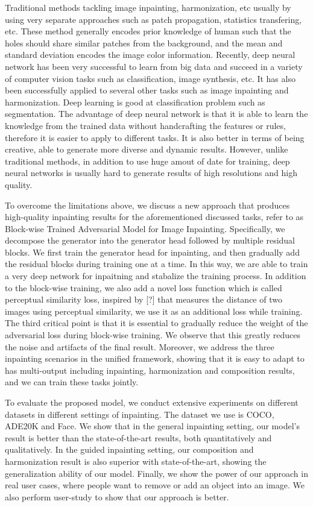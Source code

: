 \documentclass[runningheads]{llncs}
\begin{document}
Traditional methods tackling image inpainting, harmonization, etc usually by using very separate approaches such as patch propagation, statistics transfering, etc. These method generally encodes prior knowledge of human such that the holes should share similar patches from the background, and the mean and standard deviation encodes the image color information. Recently, deep neural network has been very successful to learn from big data and succeed in a variety of computer vision tasks such as classification, image synthesis, etc. It has also been successfully applied to several other tasks such as image inpainting and harmonization. Deep learning is good at classification problem such as segmentation. The advantage of deep neural network is that it is able to learn the knowledge from the trained data without handcrafting the features or rules, therefore it is easier to apply to different tasks. It is also better in terms of being creative, able to generate more diverse and dynamic results. However, unlike traditional methods, in addition to use huge amout of date for training, deep neural networks is usually hard to generate results of high resolutions and high quality.

To overcome the limitations above, we discuss a new approach that produces high-quality inpainting results for the aforementioned discussed tasks, refer to as Block-wise Trained Adversarial Model for Image Inpainting. Specifically, we decompose the generator into the generator head followed by multiple residual blocks. We first train the generator head for inpainting, and then gradually add the residual blocks during training one at a time. In this way, we are able to train a very deep network for inpaitning and stabalize the training process. In addition to the block-wise training, we also add a novel loss function which is called perceptual similarity loss, inspired by [?] that measures the distance of two images using perceptual similarity, we use it as an additional loss while training. The third critical point is that it is essential to gradually reduce the weight of the adversarial loss during block-wise training. We observe that this greatly reduces the noise and artifacts of the final result. Moreover, we address the three inpainting scenarios in the unified framework, showing that it is easy to adapt to has multi-output including inpainting, harmonization and composition results, and we can train these tasks jointly. 

To evaluate the proposed model, we conduct extensive experiments on different datasets in different settings of inpainting. The dataset we use is COCO, ADE20K and Face. We show that in the general inpainting setting, our model's result is better than the state-of-the-art results, both quantitatively and qualitatively. In the guided inpainting setting, our composition and harmonization result is also superior with state-of-the-art, showing the generalization ability of our model. Finally, we show the power of our approach in real user cases, where people want to remove or add an object into an image. We also perform user-study to show that our approach is better.  
\end{document}
